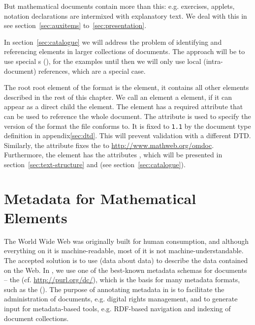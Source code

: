 But mathematical documents contain more than this: e.g. exercises, applets,
notation declarations are intermixed with explanatory text. We deal with this in
see section~\ref{sec:auxitems} to~\ref{sec:presentation}. 

In section~\ref{sec:catalogue} we will address the problem of identifying and
referencing {\omdoc} elements in larger collections of documents. The approach
will be to use special {s}
({}), for the examples until then we will only use local
(intra-document) references, which are a special case.

The {\xml} root root element of the {\omdoc} format is the {}
element, it contains all other elements described in the rest of this chapter. We
call an {\omdoc} element a {} element, if it can appear as a
direct child the {} element. The {} element has a
required attribute {} that can be used to reference the whole
document. The {} attribute is used to specify the version
of the {\omdoc} format the file conforms to. It is fixed to {\tt{1.1}} by the
{\omdoc} document type definition in appendix\ref{sec:dtd}. This will prevent
validation with a different DTD. Similarly, the {}
attribute fixes the {} to {\url{http://www.mathweb.org/omdoc}}. Furthermore, the
{} element has the attributes {}, which will
be presented in section~\ref{sec:text-structure} and
{} (see section~\ref{sec:catalogue}).

\section{Metadata for Mathematical Elements}\label{sec:metadata}

The World Wide Web was originally built for human consumption, and
although everything on it is machine-readable, most of it is not
machine-understandable.  The accepted solution is to use
{} (data about data) to describe the data contained
on the Web.  In {\omdoc}, we use one of the best-known metadata
schemas for documents -- the {}
(cf. {\url{http://purl.org/dc/}}), which is the basis for many
metadata formats, such as the {\xml} {} ({}). The purpose of annotating metadata in
{\omdoc} is to facilitate the administration of documents,
e.g. digital rights management, and to generate input for
metadata-based tools, e.g. RDF-based navigation and indexing of
document collections.

